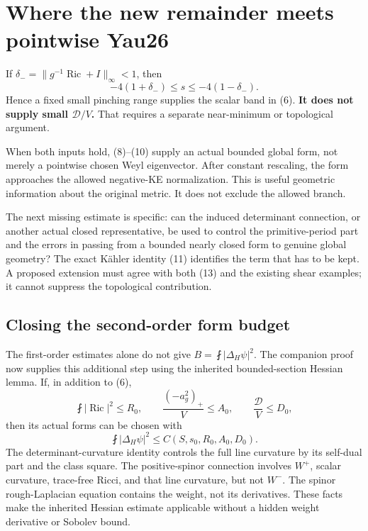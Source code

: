 \documentclass[
  11pt,
]{article}
\begin{document}
\hypertarget{where-the-new-remainder-meets-pointwise-yau26}{%
\section{Where the new remainder meets pointwise
Yau26}\label{where-the-new-remainder-meets-pointwise-yau26}}

If \(\delta_-=\|g^{-1}\operatorname{Ric}+I\|_\infty<1\), then \[
-4(1+\delta_-)\le s\le-4(1-\delta_-).
\] Hence a fixed small pinching range supplies the scalar band in (6).
\textbf{It does not supply small \(\mathscr D/V\).} That requires a
separate near-minimum or topological argument.

When both inputs hold, (8)--(10) supply an actual bounded global form,
not merely a pointwise chosen Weyl eigenvector. After constant
rescaling, the form approaches the allowed negative-KE normalization.
This is useful geometric information about the original metric. It does
not exclude the allowed branch.

The next missing estimate is specific: can the induced determinant
connection, or another actual closed representative, be used to control
the primitive-period part and the errors in passing from a bounded
nearly closed form to genuine global geometry? The exact Kähler identity
(11) identifies the term that has to be kept. A proposed extension must
agree with both (13) and the existing shear examples; it cannot suppress
the topological contribution.

\hypertarget{closing-the-second-order-form-budget}{%
\subsection{Closing the second-order form
budget}\label{closing-the-second-order-form-budget}}

The first-order estimates alone do not give \(B=\fint|\Delta_H\psi|^2\).
The companion proof now supplies this additional step using the
inherited bounded-section Hessian lemma. If, in addition to (6), \[
\fint|\operatorname{Ric}|^2\le R_0,\qquad
\frac{(-a_g^2)_+}{V}\le A_0,\qquad
\frac{\mathscr D}{V}\le D_0,
\] then its actual forms can be chosen with \[
\fint|\Delta_H\psi|^2\le C(S,s_0,R_0,A_0,D_0).
\tag{14}
\] The determinant-curvature identity controls the full line curvature
by its self-dual part and the class square. The positive-spinor
connection involves \(W^+\), scalar curvature, trace-free Ricci, and
that line curvature, but not \(W^-\). The spinor rough-Laplacian
equation contains the weight, not its derivatives. These facts make the
inherited Hessian estimate applicable without a hidden weight derivative
or Sobolev bound.
\end{document}
